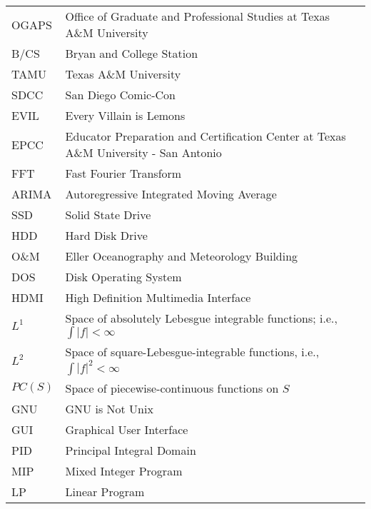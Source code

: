 \vspace{18pt}
\begin{spacing}{1.0}
	\begin{longtable}[htbp]{@{}p{} p{}@{}}
		OGAPS	&	Office of Graduate and Professional Studies at Texas A\&M University\\	[2ex]
		B/CS		&	Bryan and College Station\\	[2ex] %
		TAMU			&	Texas A\&M University\\	[2ex]
		SDCC & San Diego Comic-Con\\ [2ex]
		EVIL & Every Villain is Lemons\\ [2ex]
		EPCC & Educator Preparation and Certification Center at Texas A\&M University - San Antonio\\ [2ex]
		FFT & Fast Fourier Transform\\ [2ex]
		ARIMA & Autoregressive Integrated Moving Average\\ [2ex]
		SSD & Solid State Drive\\ [2ex]
		HDD & Hard Disk Drive\\ [2ex]
		O\&M & Eller Oceanography and Meteorology Building\\ [2ex]
		DOS & Disk Operating System\\ [2ex]
		HDMI & High Definition Multimedia Interface\\ [2ex]
		$L^1$ & Space of absolutely Lebesgue integrable functions; i.e., $\int |f| < \infty$\\ [2ex]
		$L^2$ & Space of square-Lebesgue-integrable functions, i.e., $\int |f|^2 < \infty$\\ [2ex]
		$PC(S)$ & Space of piecewise-continuous functions on $S$\\ [2ex]
		GNU & GNU is Not Unix\\ [2ex]
		GUI & Graphical User Interface\\ [2ex]
		PID & Principal Integral Domain\\ [2ex]
		MIP & Mixed Integer Program\\ [2ex]
		LP & Linear Program\\ [2ex]
	\end{longtable}
\end{spacing}

\pagebreak{}